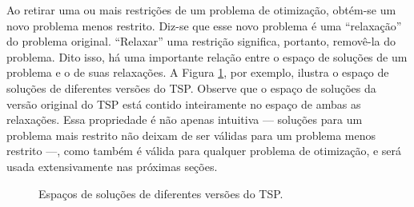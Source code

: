 {Ao retirar uma ou mais restrições de um problema de otimização, obtém-se um novo problema menos restrito. Diz-se que esse novo problema é uma ``relaxação'' do problema original. ``Relaxar'' uma restrição significa, portanto, removê-la do problema. Dito isso, há uma importante relação entre o espaço de soluções de um problema e o de suas relaxações. A Figura \ref{fig:espacoSolucoes}, por exemplo, ilustra o espaço de soluções de diferentes versões do TSP. Observe que o espaço de soluções da versão original do TSP está contido inteiramente no espaço de ambas as relaxações. Essa propriedade é não apenas intuitiva --- soluções para um problema mais restrito não deixam de ser válidas para um problema menos restrito ---, como também é válida para qualquer problema de otimização, e será usada extensivamente nas próximas seções.
 
 \begin{figure}[ht!]
     \centering
     \caption{Espaços de soluções de diferentes versões do TSP.}
     \label{fig:espacoSolucoes}
 \end{figure}


}
